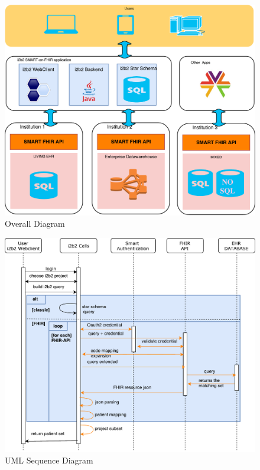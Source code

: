 \documentclass{amia}
\begin{document}
\begin{figure}[h]
\centering
\includegraphics[scale=.4]{overall.pdf}
	\caption{Overall Diagram}
\label{fig1}
\end{figure}

\begin{figure}[h]
\centering
\includegraphics[scale=.5]{sequence_diagram.pdf}
\caption{UML Sequence Diagram}
\label{fig1}
\end{figure}
\end{document}
